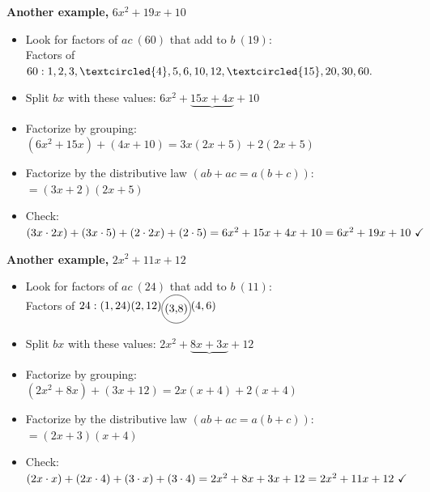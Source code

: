 \documentclass[12pt]{article}
\begin{document}
\textbf{Another example,} $6x^2+19x+10$
\begin{itemize}
\item Look for factors of $ac \ (60)$ that add to $b \ (19)$:\\
      Factors of $60: 1,2,3,\textcircled{{4}},5,6,10,12,\textcircled{15},20,30,60.$
\item Split $bx$ with these values: $6x^2+\underbrace{15x+4x}+10$
\item Factorize by grouping:\\$(6x^2+15x)+(4x+10) =  3x(2x+5)+2(2x+5)$
\item Factorize by the distributive law $(ab+ac=a(b+c))$:\\$=(3x+2)(2x+5)$
\item Check: \ $(3x\cdot2x)+(3x\cdot5)+(2\cdot2x)+(2\cdot5)\\
= 6x^2 + 15x + 4x + 10 = 6x^2 +19x + 10 \ \text{\checkmark}$
\end{itemize}

\newpage

\textbf{Another example,} $2x^2+11x+12$
\begin{itemize}
\item Look for factors of $ac \ (24)$ that add to $b \ (11)$:\\
      Factors of $24: (1,24)(2,12)\tikz[baseline]{\node[draw,circle,inner sep=1pt] {(3,8)};}(4,6)$
\item Split $bx$ with these values: $2x^2+\underbrace{8x+3x}+12$
\item Factorize by grouping:\\$(2x^2+8x)+(3x+12) =  2x(x+4)+2(x+4)$
\item Factorize by the distributive law $(ab+ac=a(b+c))$:\\$=(2x+3)(x+4)$
\item Check: \ $(2x \cdot x)+(2x \cdot 4)+(3 \cdot x)+(3 \cdot 4)\\
= 2x^2 + 8x + 3x + 12 = 2x^2 + 11x + 12 \ \text{\checkmark}$
\end{itemize}
\end{document}
